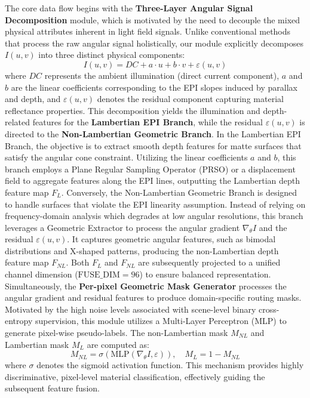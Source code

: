 The core data flow begins with the \textbf{Three-Layer Angular Signal Decomposition} module, which is motivated by the need to decouple the mixed physical attributes inherent in light field signals. Unlike conventional methods that process the raw angular signal holistically, our module explicitly decomposes $I(u,v)$ into three distinct physical components:
\begin{equation}
\label{eq:eq1}
I(u,v) = DC + a \cdot u + b \cdot v + \varepsilon(u,v)
\end{equation}
where $DC$ represents the ambient illumination (direct current component), $a$ and $b$ are the linear coefficients corresponding to the EPI slopes induced by parallax and depth, and $\varepsilon(u,v)$ denotes the residual component capturing material reflectance properties. This decomposition yields the illumination and depth-related features for the \textbf{Lambertian EPI Branch}, while the residual $\varepsilon(u,v)$ is directed to the \textbf{Non-Lambertian Geometric Branch}. In the Lambertian EPI Branch, the objective is to extract smooth depth features for matte surfaces that satisfy the angular cone constraint. Utilizing the linear coefficients $a$ and $b$, this branch employs a Plane Regular Sampling Operator (PRSO) or a displacement field to aggregate features along the EPI lines, outputting the Lambertian depth feature map $F_L$. Conversely, the Non-Lambertian Geometric Branch is designed to handle surfaces that violate the EPI linearity assumption. Instead of relying on frequency-domain analysis which degrades at low angular resolutions, this branch leverages a Geometric Extractor to process the angular gradient $\nabla_{\theta} I$ and the residual $\varepsilon(u,v)$. It captures geometric angular features, such as bimodal distributions and X-shaped patterns, producing the non-Lambertian depth feature map $F_{NL}$. Both $F_L$ and $F_{NL}$ are subsequently projected to a unified channel dimension ($\text{FUSE\_DIM} = 96$) to ensure balanced representation. Simultaneously, the \textbf{Per-pixel Geometric Mask Generator} processes the angular gradient and residual features to produce domain-specific routing masks. Motivated by the high noise levels associated with scene-level binary cross-entropy supervision, this module utilizes a Multi-Layer Perceptron (MLP) to generate pixel-wise pseudo-labels. The non-Lambertian mask $M_{NL}$ and Lambertian mask $M_L$ are computed as:
\begin{equation}
\label{eq:eq2}
M_{NL} = \sigma(\text{MLP}(\nabla_{\theta} I, \varepsilon)), \quad M_L = 1 - M_{NL}
\end{equation}
where $\sigma$ denotes the sigmoid activation function. This mechanism provides highly discriminative, pixel-level material classification, effectively guiding the subsequent feature fusion.

